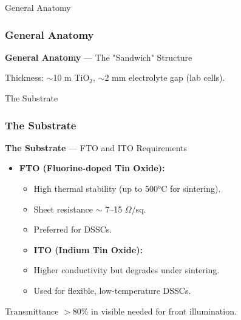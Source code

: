 \documentclass[aspectratio=169]{beamer}
\begin{document}
\begin{frame}{General Anatomy}
\frametitle{General Anatomy}

\textbf{General Anatomy} — The "Sandwich" Structure
\begin{center}
\end{center}
Thickness: $\sim$10 \textmu m TiO$_2$, $\sim$2 mm electrolyte gap (lab cells).
\cite{Kalyanasundaram2010}
\end{frame}


\begin{frame}{The Substrate}
\frametitle{The Substrate}

\textbf{The Substrate} — FTO and ITO Requirements
\begin{itemize}
\item \textbf{FTO (Fluorine-doped Tin Oxide):}
\begin{itemize}
\item High thermal stability (up to 500°C for sintering).
\item Sheet resistance $\sim$ 7–15 $\Omega$/sq.
\item Preferred for DSSCs.
\end{itemize}
\begin{itemize}
\item \textbf{ITO (Indium Tin Oxide):}
\end{itemize}
\begin{itemize}
\item Higher conductivity but degrades under sintering.
\item Used for flexible, low-temperature DSSCs.
\end{itemize}
\end{itemize}
Transmittance $>$80\% in visible needed for front illumination.
\cite{Gordillo2006}
\end{frame}
\end{document}
